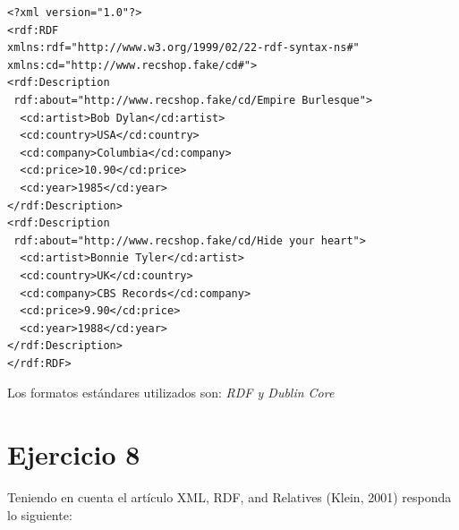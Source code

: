 \documentclass[a4paper,12pt,twoside,final,spanish]{article}
\begin{document}
\begin{lstlisting}
<?xml version="1.0"?>
<rdf:RDF
xmlns:rdf="http://www.w3.org/1999/02/22-rdf-syntax-ns#" 
xmlns:cd="http://www.recshop.fake/cd#"> 
<rdf:Description
 rdf:about="http://www.recshop.fake/cd/Empire Burlesque">
  <cd:artist>Bob Dylan</cd:artist>
  <cd:country>USA</cd:country>
  <cd:company>Columbia</cd:company>
  <cd:price>10.90</cd:price>
  <cd:year>1985</cd:year>
</rdf:Description>
<rdf:Description
 rdf:about="http://www.recshop.fake/cd/Hide your heart">
  <cd:artist>Bonnie Tyler</cd:artist>
  <cd:country>UK</cd:country>
  <cd:company>CBS Records</cd:company>
  <cd:price>9.90</cd:price>
  <cd:year>1988</cd:year>
</rdf:Description>
</rdf:RDF> 
\end{lstlisting}

Los formatos estándares utilizados son: \textit{RDF y Dublin Core}

\section*{Ejercicio 8}

Teniendo en cuenta el artículo XML, RDF, and Relatives (Klein, 2001) responda lo siguiente:
\end{document}
